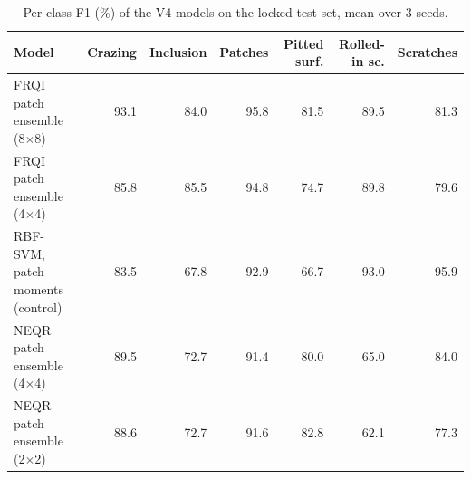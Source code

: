 \begin{table}[!t]
\centering
\caption{Per-class F1 (\%) of the V4 models on the locked test set, mean over 3 seeds.}
\label{tab:per_class_f1}
\footnotesize
\begin{tabular}{lrrrrrr}
\toprule
\textbf{Model} & \textbf{Crazing} & \textbf{Inclusion} & \textbf{Patches} & \textbf{Pitted surf.} & \textbf{Rolled-in sc.} & \textbf{Scratches} \\
\midrule
FRQI patch ensemble (8$\times$8) & 93.1 & 84.0 & 95.8 & 81.5 & 89.5 & 81.3 \\
FRQI patch ensemble (4$\times$4) & 85.8 & 85.5 & 94.8 & 74.7 & 89.8 & 79.6 \\
RBF-SVM, patch moments (control) & 83.5 & 67.8 & 92.9 & 66.7 & 93.0 & 95.9 \\
NEQR patch ensemble (4$\times$4) & 89.5 & 72.7 & 91.4 & 80.0 & 65.0 & 84.0 \\
NEQR patch ensemble (2$\times$2) & 88.6 & 72.7 & 91.6 & 82.8 & 62.1 & 77.3 \\
\bottomrule
\end{tabular}
\end{table}
